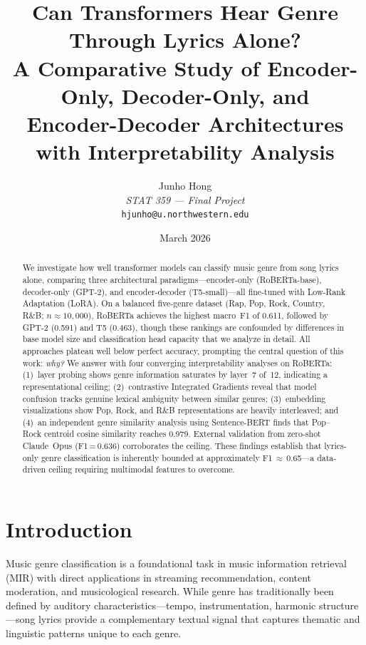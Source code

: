 \documentclass[11pt,a4paper]{article}
\title{
  \textbf{Can Transformers Hear Genre Through Lyrics Alone?}\\[6pt]
  \large A Comparative Study of Encoder-Only, Decoder-Only, and\\
  Encoder-Decoder Architectures with Interpretability Analysis
}
\author{
  Junho Hong\\
  \textit{STAT 359 --- Final Project}\\
  \texttt{hjunho@u.northwestern.edu}
}
\date{March 2026}
\begin{document}
\maketitle

\begin{abstract}
We investigate how well transformer models can classify music genre from
song lyrics alone, comparing three architectural paradigms---encoder-only
(RoBERTa-base), decoder-only (GPT-2), and encoder-decoder
(T5-small)---all fine-tuned with Low-Rank Adaptation (LoRA).
On a balanced five-genre dataset (Rap, Pop, Rock, Country, R\&B;
$n \approx 10{,}000$), RoBERTa achieves the highest macro~F1 of 0.611,
followed by GPT-2 (0.591) and T5 (0.463), though these rankings are
confounded by differences in base model size and classification head
capacity that we analyze in detail.
All approaches plateau well below perfect accuracy, prompting the central
question of this work: \emph{why?}
We answer with four converging interpretability analyses on RoBERTa:
(1)~layer probing shows genre information saturates by layer~7 of~12,
indicating a representational ceiling;
(2)~contrastive Integrated Gradients reveal that model confusion tracks
genuine lexical ambiguity between similar genres;
(3)~embedding visualizations show Pop, Rock, and R\&B representations
are heavily interleaved;
and (4)~an independent genre similarity analysis using Sentence-BERT
finds that Pop--Rock centroid cosine similarity reaches 0.979.
External validation from zero-shot Claude~Opus (F1\,=\,0.636)
corroborates the ceiling.
These findings establish that lyrics-only genre classification is
inherently bounded at approximately F1\,$\approx$\,0.65---a data-driven
ceiling requiring multimodal features to overcome.
\end{abstract}

\section{Introduction}
\label{sec:intro}

Music genre classification is a foundational task in music information
retrieval (MIR) with direct applications in streaming recommendation,
content moderation, and musicological research.
While genre has traditionally been defined by auditory
characteristics---tempo, instrumentation, harmonic structure---song
lyrics provide a complementary textual signal that captures thematic and
linguistic patterns unique to each genre.
\end{document}

